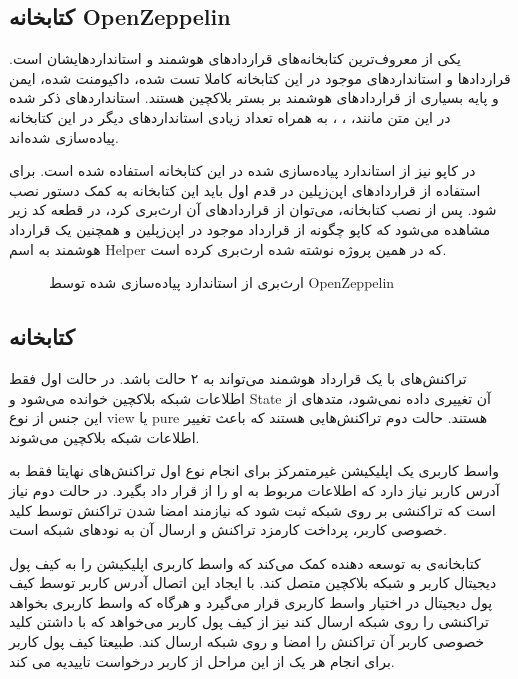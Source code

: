 \subsection{کتابخانه OpenZeppelin}
یکی از معروف‌ترین کتابخانه‌های قراردادهای هوشمند و استانداردهایشان است. قراردادها و استانداردهای موجود در این کتابخانه کاملا تست شده، داکیومنت شده، ایمن و پایه بسیاری از قراردادهای هوشمند بر بستر بلاکچین هستند.
استانداردهای ذکر شده در این متن مانند،
،
،
به همراه تعداد زیادی استانداردهای دیگر در این کتابخانه پیاده‌سازی شده‌اند.

در کاپو نیز از استاندارد
پیاده‌سازی شده در این کتابخانه استفاده شده است. برای استفاده از قرارداد‌های اپن‌زپلین در قدم اول باید این کتابخانه به کمک دستور
نصب شود. پس از نصب کتابخانه، می‌توان از قراردادهای آن ارث‌بری کرد، در قطعه کد زیر مشاهده می‌شود که کاپو چگونه از قرارداد
موجود در اپن‌زپلین و همچنین یک قرارداد هوشمند به اسم Helper که در همین پروژه نوشته شده ارث‌بری کرده است.

\begin{figure}[ht]
\centerline{}
\caption{ارث‌بری از استاندارد  پیاده‌سازی شده توسط OpenZeppelin}
\label{fig:inherit-erc721}
\end{figure}

\subsection{کتابخانه }
تراکنش‌های با یک قرارداد هوشمند می‌تواند به ۲ حالت باشد. در حالت اول فقط اطلاعات شبکه بلاکچین خوانده می‌شود و
\gls{State}
آن تغییری داده نمی‌شود، متدهای از این جنس از نوع view یا pure هستند. حالت دوم تراکنش‌هایی هستند که باعث تغییر اطلاعات شبکه بلاکچین می‌شوند.

واسط کاربری یک اپلیکیشن غیرمتمرکز برای انجام نوع اول تراکنش‌های نهایتا فقط به آدرس کاربر نیاز دارد که اطلاعات مربوط به او را از قرار داد بگیرد. در حالت دوم نیاز است که تراکنشی بر روی شبکه ثبت شود که نیازمند امضا شدن تراکنش توسط کلید خصوصی کاربر، پرداخت کارمزد تراکنش و ارسال آن به نودهای شبکه است.

کتابخانه‌ی
به توسعه دهنده کمک می‌کند که واسط کاربری اپلیکیشن را به کیف پول دیجیتال کاربر و شبکه بلاکچین متصل کند. با ایجاد این اتصال آدرس کاربر توسط کیف پول دیجیتال در اختیار واسط کاربری قرار می‌گیرد و هرگاه که واسط کاربری بخواهد تراکنشی را روی شبکه ارسال کند نیز از کیف پول کاربر می‌خواهد که با داشتن کلید خصوصی کاربر آن تراکنش را امضا و روی شبکه ارسال کند. طبیعتا کیف پول کاربر برای انجام هر یک از این مراحل از کاربر درخواست تاییدیه می کند.



